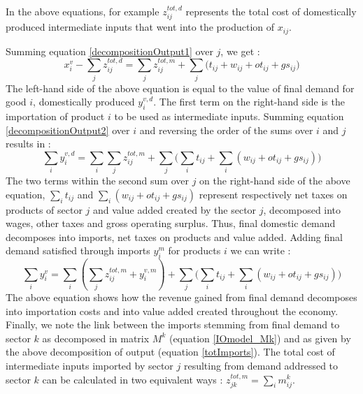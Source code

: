 \documentclass[12pt,english]{article}
\begin{document}
In the above equations, for example $z^{tot,d}_{ij}$ represents the total cost of domestically produced intermediate inputs that went into the production of $x_{ij}$. %

Summing equation \ref{decompositionOutput1} over $j$, we get :
\begin{equation}
x^v_i - \sum_j z^{tot,d}_{ij}  = \sum_j z^{tot,m}_{ij} + \sum_j \big(t_{ij} + w_{ij} + ot_{ij} + gs_{ij}\big) \label{decompositionOutput2}
\end{equation}
The left-hand side of the above equation is equal to the value of final demand for good $i$, domestically produced $y^{v,d}_i$. The first term on the right-hand side is the importation of product $i$ to be used as intermediate inputs. %
Summing equation \ref{decompositionOutput2} over $i$ and reversing the order of the sums over $i$ and $j$ results in :
\begin{equation}
\sum_i y^{v,d}_i  = \sum_{i}\sum_{j} z^{tot,m}_{ij} + \sum_j \big( \sum_i t_{ij} + \sum_i (w_{ij} + ot_{ij} + gs_{ij})\big) \label{decompositionOutput3}
\end{equation}
The two terms within the second sum over $j$ on the right-hand side of the above equation, $\sum_i t_{ij}$ and $\sum_i (w_{ij} + ot_{ij} + gs_{ij})$ represent respectively net taxes on products of sector $j$ and value added created by the sector $j$, decomposed into wages, other taxes and gross operating surplus. Thus, final domestic demand decomposes into imports, net taxes on products and value added. Adding final demand satisfied through imports $y^m_i$ for products $i$ we can write :
\begin{equation}
\sum_i y^v_i =  \sum_i (\sum_{j} z^{tot,m}_{ij} + y^{v,m}_i) + \sum_j \big( \sum_i t_{ij} + \sum_i (w_{ij} + ot_{ij} + gs_{ij})\big) \label{decompositionOutput4}
\end{equation}
The above equation shows how the revenue gained from final demand decomposes into importation costs and into value added created throughout the economy. Finally, we note the link between the imports stemming from final demand to sector $k$ as decomposed in matrix $M^k$ (equation \ref{IOmodel_Mk}) and as given by the above decomposition of output (equation \ref{totImports}). The total cost of intermediate inputs imported by sector $j$ resulting from demand addressed to sector $k$ can be calculated in two equivalent ways : $z^{tot,m}_{jk} = \sum_i m_{ij}^k$. %
\end{document}
